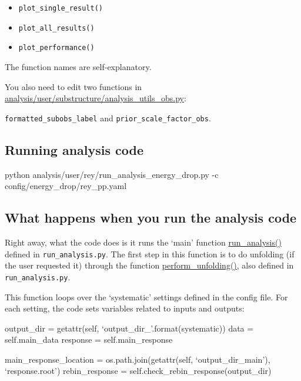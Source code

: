 \documentclass[12pt]{article}
\begin{document}
\begin{itemize}
\item \verb|plot_single_result()|
\item \verb|plot_all_results()|
\item \verb|plot_performance()|
\end{itemize}

The function names are self-explanatory.

You also need to edit two functions in \href{https://github.com/reynier0611/pyjetty/blob/master/pyjetty/alice_analysis/analysis/user/substructure/analysis_utils_obs.py}{analysis/user/substructure/analysis\_utils\_obs.py}:

\verb|formatted_subobs_label| and \verb|prior_scale_factor_obs|.

\subsection{Running analysis code}

\begin{tcolorbox}
\begin{verbnobox}[\scriptsize]
python analysis/user/rey/run_analysis_energy_drop.py  -c config/energy_drop/rey_pp.yaml
\end{verbnobox}  
\end{tcolorbox}

\subsection{What happens when you run the analysis code}

Right away, what the code does is it runs the `main' function \href{https://github.com/reynier0611/pyjetty/blob/master/pyjetty/alice_analysis/analysis/user/substructure/run_analysis.py#L223}{run\_analysis()} defined in \verb|run_analysis.py|.
The first step in this function is to do unfolding (if the user requested it) through the function \href{https://github.com/reynier0611/pyjetty/blob/master/pyjetty/alice_analysis/analysis/user/substructure/run_analysis.py#L257}{perform\_unfolding()},
also defined in \verb|run_analysis.py|.

This function loops over the `systematic' settings defined in the config file. For each setting, the code sets variables related to inputs and outputs:

\begin{tcolorbox}
\begin{verbnobox}[\scriptsize]
output_dir = getattr(self, `output_dir_{}'.format(systematic))
data = self.main_data
response = self.main_response

main_response_location = os.path.join(getattr(self, `output_dir_main'), `response.root')
rebin_response = self.check_rebin_response(output_dir)
\end{verbnobox}  
\end{tcolorbox}
\end{document}
